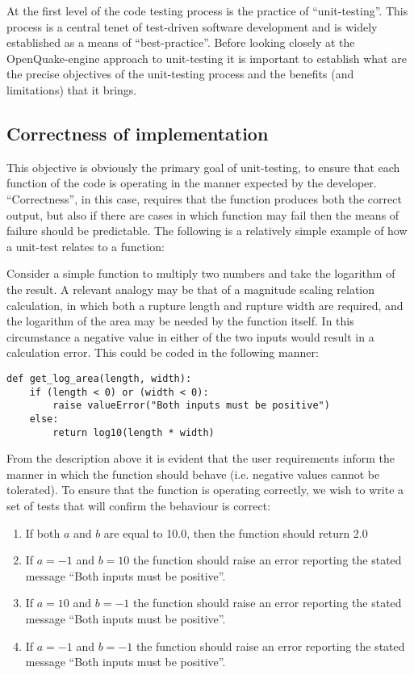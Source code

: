 At the first level of the code testing process is the practice of
``unit-testing''. This process is a central tenet of test-driven software
development and is widely established as a means of ``best-practice''. %
Before looking closely at the OpenQuake-engine
approach to unit-testing it is important to establish what are the precise objectives of the unit-testing process and the benefits (and limitations) that it brings.


\subsection{Correctness of implementation}
This objective is obviously the primary goal of unit-testing, to ensure that each function of the code is operating in the manner expected by the developer. ``Correctness'', in this case, requires that the function produces both the correct output, but also if there are cases in which function may fail then the means of failure should be predictable. The following is a relatively simple example of how a unit-test relates to a function:

Consider a simple function to multiply two numbers and take the logarithm of the result. A relevant analogy may be that of a magnitude scaling relation calculation, in which both a rupture length and rupture width are required, and the logarithm of the area may be needed by the function itself. In this circumstance a negative value in either of the two inputs would result in a calculation error. This could be coded in the following manner:

\begin{lstlisting}[frame=single]
def get_log_area(length, width):
    if (length < 0) or (width < 0):
        raise valueError("Both inputs must be positive")
    else:
        return log10(length * width)
\end{lstlisting}

From the description above it is evident that the user requirements  inform the manner in which the function should behave (i.e. negative
values cannot be tolerated). To ensure that the function is operating
correctly, we wish to write a set of tests that will confirm the behaviour is correct:

\begin{enumerate}
\item If both $a$ and $b$ are equal to 10.0, then the function     should return 2.0
\item If $a = -1$ and $b = 10$ the function should raise an error     reporting the stated message ``Both inputs must be positive''.
\item If $a = 10$ and $b = -1$ the function should raise an error     reporting the stated message ``Both inputs must be positive''.
\item If $a = -1$ and $b = -1$ the function should raise an error     reporting the stated message ``Both inputs must be positive''.
\end{enumerate}


